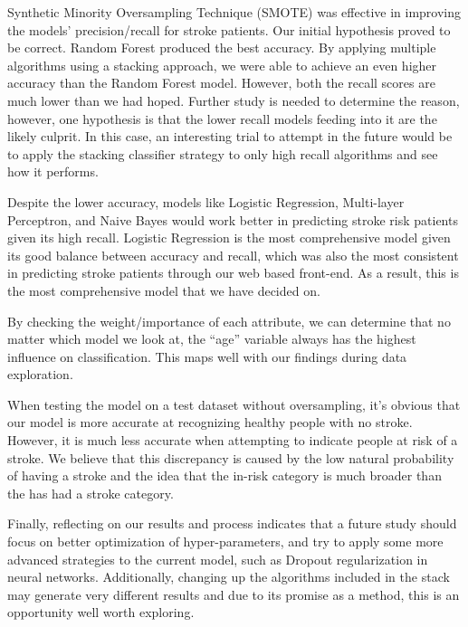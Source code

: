 \documentclass[11pt]{article}
\begin{document}
Synthetic Minority Oversampling Technique (SMOTE) was effective in improving the models’ precision/recall for stroke patients. Our initial hypothesis proved to be correct. Random Forest produced the best accuracy. By applying multiple algorithms using a stacking approach, we were able to achieve an even higher accuracy than the Random Forest model. However, both the recall scores are much lower than we had hoped. Further study is needed to determine the reason, however, one hypothesis is that the lower recall models feeding into it are the likely culprit. In this case, an interesting trial to attempt in the future would be to apply the stacking classifier strategy to only high recall algorithms and see how it performs.

\medskip

Despite the lower accuracy, models like Logistic Regression, Multi-layer Perceptron, and Naive Bayes would work better in predicting stroke risk patients given its high recall.
Logistic Regression is the most comprehensive model given its good balance between accuracy and recall, which was also the most consistent in predicting stroke patients through our web based front-end. As a result, this is the most comprehensive model that we have decided on.

\medskip

By checking the weight/importance of each attribute, we can determine that no matter which model we look at, the “age” variable always has the highest influence on classification. This maps well with our findings during data exploration.

\medskip

When testing the model on a test dataset without oversampling, it’s obvious that our model is more accurate at recognizing healthy people with no stroke. However, it is much less accurate when attempting to indicate people at risk of a stroke.  We believe that this discrepancy is caused by the low natural probability of having a stroke and the idea that the in-risk category is much broader than the has had a stroke category.

\medskip

Finally, reflecting on our results and process indicates that a future study should focus on  better optimization of hyper-parameters, and try to apply some more advanced strategies to the current model, such as Dropout regularization in neural networks. Additionally, changing up the algorithms included in the stack may generate very different results and due to its promise as a method, this is an opportunity well worth exploring.
\end{document}
